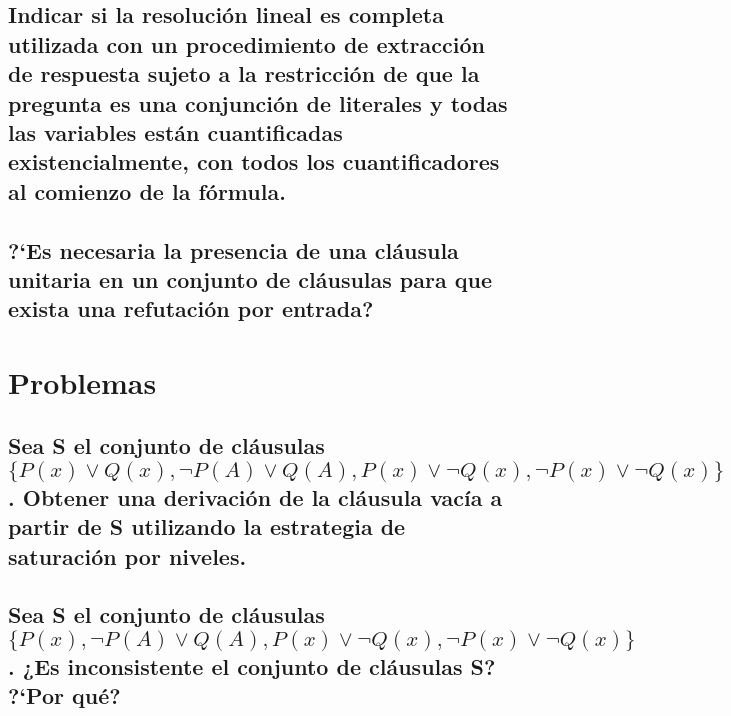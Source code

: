 \documentclass[10pt, a4paper,spanish]{article}
\begin{document}
		\subsection{Indicar si la resolución lineal es completa utilizada con un procedimiento de extracción de respuesta sujeto a la restricción de que la pregunta es una conjunción de literales y todas las variables están cuantificadas existencialmente, con todos los cuantificadores al comienzo de la fórmula.}
			\paragraph{}


		\subsection{?`Es necesaria la presencia de una cláusula unitaria en un conjunto de cláusulas para que exista una refutación por entrada?}

			\paragraph{}


	\section{Problemas}

		\subsection{Sea S el conjunto de cláusulas $ \{ P(x) \lor Q(x), \lnot P(A) \lor Q(A), P(x) \lor \lnot Q(x), \lnot P(x) \lor \lnot Q(x) \} $. Obtener una derivación de la cláusula vacía a partir de S utilizando la estrategia de saturación por niveles.}

			\paragraph{}


		\subsection{Sea S el conjunto de cláusulas $ \{ P(x), \lnot P(A) \lor Q(A), P(x) \lor \lnot Q(x), \lnot P(x) \lor \lnot Q(x) \} $. ¿Es inconsistente el conjunto de cláusulas S? ?`Por qué?}

			\paragraph{}
\end{document}
